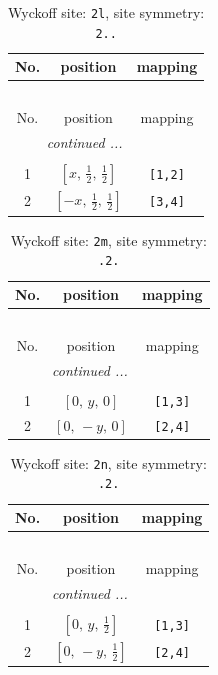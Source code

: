 \documentclass[fleqn,8pt]{jsarticle}
\begin{document}
\begin{longtable}{ccc}
\caption{Wyckoff site: {\tt 2l}, site symmetry: {\tt 2..}}
 \\
 \hline \hline
No. & position & mapping \\ \hline \endfirsthead

\multicolumn{2}{l}{\tablename\ \thetable{}} \\
 \hline \hline
No. & position & mapping \\ \hline \endhead

 \hline \hline
\multicolumn{2}{r}{\footnotesize\it continued ...} \\ \endfoot

 \hline \hline
\multicolumn{2}{r}{} \\ \endlastfoot

1 & $\left[ x,\, \frac{1}{2},\, \frac{1}{2} \right]$ & {\tt [1,2]} \\ \hline
2 & $\left[ - x,\, \frac{1}{2},\, \frac{1}{2} \right]$ & {\tt [3,4]} \\
\end{longtable}
\renewcommand{\arraystretch}{1.2}
\begin{longtable}{ccc}
\caption{Wyckoff site: {\tt 2m}, site symmetry: {\tt .2.}}
 \\
 \hline \hline
No. & position & mapping \\ \hline \endfirsthead

\multicolumn{2}{l}{\tablename\ \thetable{}} \\
 \hline \hline
No. & position & mapping \\ \hline \endhead

 \hline \hline
\multicolumn{2}{r}{\footnotesize\it continued ...} \\ \endfoot

 \hline \hline
\multicolumn{2}{r}{} \\ \endlastfoot

1 & $\left[ 0,\, y,\, 0 \right]$ & {\tt [1,3]} \\ \hline
2 & $\left[ 0,\, - y,\, 0 \right]$ & {\tt [2,4]} \\
\end{longtable}
\renewcommand{\arraystretch}{1.2}
\begin{longtable}{ccc}
\caption{Wyckoff site: {\tt 2n}, site symmetry: {\tt .2.}}
 \\
 \hline \hline
No. & position & mapping \\ \hline \endfirsthead

\multicolumn{2}{l}{\tablename\ \thetable{}} \\
 \hline \hline
No. & position & mapping \\ \hline \endhead

 \hline \hline
\multicolumn{2}{r}{\footnotesize\it continued ...} \\ \endfoot

 \hline \hline
\multicolumn{2}{r}{} \\ \endlastfoot

1 & $\left[ 0,\, y,\, \frac{1}{2} \right]$ & {\tt [1,3]} \\ \hline
2 & $\left[ 0,\, - y,\, \frac{1}{2} \right]$ & {\tt [2,4]} \\
\end{longtable}
\end{document}
